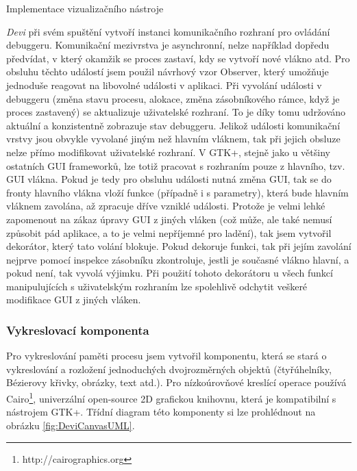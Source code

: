 \documentclass[czech,bachelor,male,python,dept460]{diploma}						%
\newcommand{\parspace}[1][]{
	\ifthenelse{\isempty{#1}}{\vspace{5mm}}{\vspace{#1}}
	\par
}
\begin{document}
\begin{section}{Implementace vizualizačního nástroje}
	\parspace \textit{Devi} při svém spuštění vytvoří instanci komunikačního rozhraní pro ovládání debuggeru. Komunikační mezivrstva je asynchronní,
	nelze například dopředu předvídat, v který okamžik se proces zastaví, kdy se vytvoří nové vlákno atd. Pro obsluhu těchto událostí jsem použil návrhový vzor
	Observer\cite[326]{gof}, který umožňuje jednoduše reagovat na libovolné události v aplikaci. Při vyvolání události v debuggeru (změna stavu procesu,
	alokace, změna zásobníkového rámce, když je proces zastavený) se aktualizuje uživatelské rozhraní. To je díky tomu udržováno aktuální a konzistentně zobrazuje
	stav debuggeru. Jelikož události komunikační vrstvy jsou obvykle vyvolané jiným než hlavním vláknem, tak při jejich obsluze nelze přímo modifikovat uživatelské
	rozhraní. V GTK+, stejně jako u většiny ostatních GUI frameworků, lze totiž pracovat s rozhraním pouze z hlavního, tzv. GUI vlákna. Pokud je tedy pro
	obsluhu události nutná změna GUI, tak se do fronty hlavního vlákna vloží funkce (případně i s parametry), která bude hlavním vláknem zavolána,
	až zpracuje dříve vzniklé události. Protože je velmi lehké zapomenout na zákaz úpravy GUI z jiných vláken (což může, ale také nemusí způsobit pád
	aplikace, a to je velmi nepříjemné pro ladění), tak jsem vytvořil dekorátor, který tato volání blokuje. Pokud dekoruje funkci, tak při jejím zavolání
	nejprve pomocí inspekce zásobníku zkontroluje, jestli je současné vlákno hlavní, a pokud není, tak vyvolá výjimku. Při použití tohoto dekorátoru u všech
	funkcí manipulujících s uživatelským rozhraním lze spolehlivě odchytit veškeré modifikace GUI z jiných vláken.
	
	\subsubsection{Vykreslovací komponenta}
	Pro vykreslování paměti procesu jsem vytvořil komponentu, která se stará o vykreslování a rozložení jednoduchých dvojrozměrných objektů
	(čtyřúhelníky, Bézierovy křivky, obrázky, text atd.). Pro nízkoúrovňové kreslící operace používá Cairo\footnote{http://cairographics.org}, univerzální
	open-source 2D grafickou knihovnu, která je kompatibilní s nástrojem GTK+. Třídní diagram této komponenty si lze prohlédnout na obrázku
	\ref{fig:DeviCanvasUML}.
	
	

\end{section}
\end{document}
